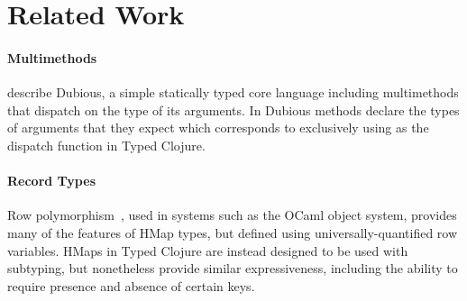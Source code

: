 \section{Related Work}

\paragraph{Multimethods} 
\citet{MS02} describe Dubious, a simple statically typed core language including multimethods that
dispatch on the type of its arguments. 
In Dubious methods declare the types of arguments that they expect which corresponds to
exclusively using  as the dispatch function in Typed Clojure.







\paragraph{Record Types} Row polymorphism~\cite{Wan89,CM91,HP91}, used
in systems such as the OCaml object system, provides many of the
features of HMap types, but defined using universally-quantified row
variables. HMaps in Typed Clojure are instead designed to be used with
subtyping, but nonetheless provide similar expressiveness, including
the ability to require presence and absence of certain keys. 

